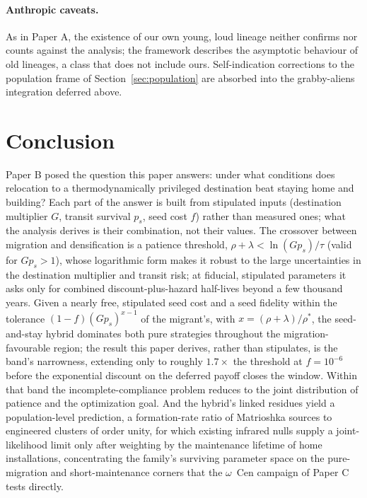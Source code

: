 \documentclass[11pt]{article}
\begin{document}
\paragraph{Anthropic caveats.} As in Paper A, the existence of our own young, loud lineage neither confirms nor counts against the analysis; the framework describes the asymptotic behaviour of old lineages, a class that does not include ours. Self-indication corrections to the population frame of Section~\ref{sec:population} are absorbed into the grabby-aliens integration deferred above.

\section{Conclusion}
\label{sec:conclusion}

Paper B posed the question this paper answers: under what conditions does relocation to a thermodynamically privileged destination beat staying home and building? Each part of the answer is built from stipulated inputs (destination multiplier $G$, transit survival $p_s$, seed cost $f$) rather than measured ones; what the analysis derives is their combination, not their values. The crossover between migration and densification is a patience threshold, $\rho + \lambda < \ln(G p_{s})/\tau$ (valid for $G p_s > 1$), whose logarithmic form makes it robust to the large uncertainties in the destination multiplier and transit risk; at fiducial, stipulated parameters it asks only for combined discount-plus-hazard half-lives beyond a few thousand years. Given a nearly free, stipulated seed cost and a seed fidelity within the tolerance $(1-f)(G p_{s})^{x-1}$ of the migrant's, with $x = (\rho+\lambda)/\rho^{*}$, the seed-and-stay hybrid dominates both pure strategies throughout the migration-favourable region; the result this paper derives, rather than stipulates, is the band's narrowness, extending only to roughly $1.7\times$ the threshold at $f = 10^{-6}$ before the exponential discount on the deferred payoff closes the window. Within that band the incomplete-compliance problem reduces to the joint distribution of patience and the optimization goal. And the hybrid's linked residues yield a population-level prediction, a formation-rate ratio of Matrioshka sources to engineered clusters of order unity, for which existing infrared nulls supply a joint-likelihood limit only after weighting by the maintenance lifetime of home installations, concentrating the family's surviving parameter space on the pure-migration and short-maintenance corners that the $\omega$~Cen campaign of Paper C tests directly.
\end{document}
